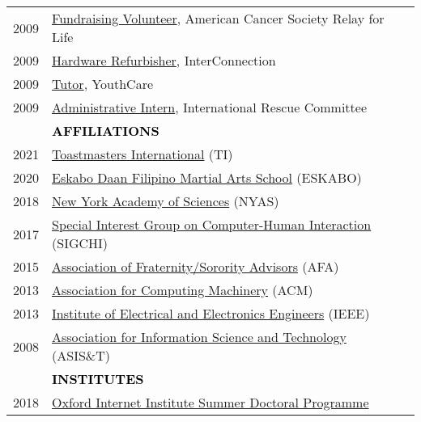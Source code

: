 \documentclass[11pt]{article}
\begin{document}
{{\begin{longtable}{Rp{0.75in}p{5.0in}}
\footnotesize{2009} & \href{https://www.cancer.org/involved/fundraise/relay-for-life.html}{Fundraising Volunteer}, American Cancer Society Relay for Life\\

\footnotesize{2009} & \href{http://www.washington.edu/news/2010/04/22/student-service-and-leadership-to-be-celebrated-april-28/}{Hardware Refurbisher}, InterConnection\\

\footnotesize{2009} & \href{https://youthcare.org}{Tutor}, YouthCare\\

\footnotesize{2009} & \href{https://www.rescue.org}{Administrative Intern}, International Rescue Committee\\

& \textcolor{black}{\uppercase{\textbf{Affiliations}}}\\
\footnotesize{2021} & \href{https://www.toastmasters.org/}{Toastmasters International} (TI)\\

\footnotesize{2020} & \href{https://www.eskabodaan.org/}{Eskabo Daan Filipino Martial Arts School} (ESKABO)\\

\footnotesize{2018} & \href{https://www.nyas.org/}{New York Academy of Sciences} (NYAS)\\

\footnotesize{2017} & \href{https://www.sigchi.org/}{Special Interest Group on Computer-Human Interaction} (SIGCHI)\\

\footnotesize{2015} & \href{https://www.acm.org/}{Association of Fraternity/Sorority Advisors} (AFA)\\

\footnotesize{2013} & \href{https://www.acm.org/}{Association for Computing Machinery} (ACM)\\

\footnotesize{2013} & \href{https://www.ieee.org/}{Institute of Electrical and Electronics Engineers} (IEEE)\\

\footnotesize{2008} & \href{https://www.asist.org/}{Association for Information Science and Technology} (ASIS\&T) \\

& \textcolor{black}{\uppercase{\textbf{Institutes}}}\\

\footnotesize{2018} & \href{https://www.oii.ox.ac.uk/study/summer-doctoral-programme/alumni/}{Oxford Internet Institute Summer Doctoral Programme}\\


\end{longtable}}}
\end{document}
